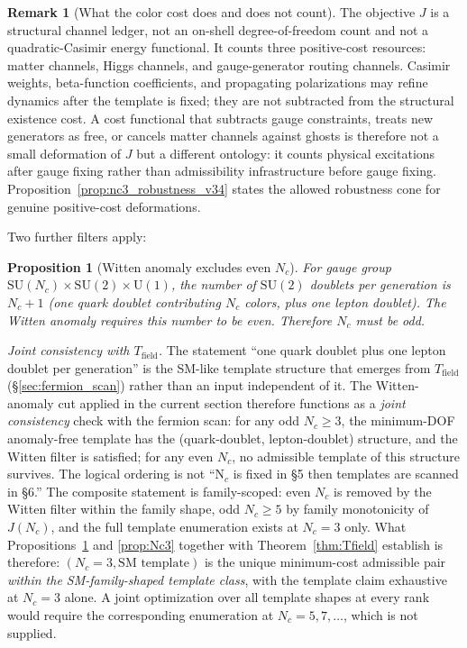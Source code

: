 \documentclass[11pt]{article}
\newtheorem{proposition}[theorem]{Proposition}
\theoremstyle{definition}
\newtheorem{remark}[theorem]{Remark}
\newcommand{\SU}{\mathrm{SU}}
\newcommand{\U}{\mathrm{U}}
\begin{document}
\begin{remark}[What the color cost does and does not count]
\label{rem:color_cost_functional_v35}
The objective $J$ is a structural channel ledger, not an on-shell degree-of-freedom count and not a quadratic-Casimir energy functional.  It counts three positive-cost resources: matter channels, Higgs channels, and gauge-generator routing channels.  Casimir weights, beta-function coefficients, and propagating polarizations may refine dynamics after the template is fixed; they are not subtracted from the structural existence cost.  A cost functional that subtracts gauge constraints, treats new generators as free, or cancels matter channels against ghosts is therefore not a small deformation of $J$ but a different ontology: it counts physical excitations after gauge fixing rather than admissibility infrastructure before gauge fixing.  Proposition~\ref{prop:nc3_robustness_v34} states the allowed robustness cone for genuine positive-cost deformations.
\end{remark}

Two further filters apply:

\begin{proposition}[Witten anomaly excludes even $N_c$]\label{prop:witten}
For gauge group $\SU(N_c) \times \SU(2) \times \U(1)$, the number of
$\SU(2)$ doublets per generation is $N_c + 1$ (one quark doublet
contributing $N_c$ colors, plus one lepton doublet).  The Witten anomaly
\cite{Witten1982} requires this number to be even.  Therefore $N_c$ must
be odd.
\end{proposition}

\noindent\textit{Joint consistency with $T_{\mathrm{field}}$.}\quad
The statement ``one quark doublet plus one lepton doublet per generation''
is the SM-like template structure that emerges from $T_{\mathrm{field}}$
(\S\ref{sec:fermion_scan}) rather than an input independent of it.  The
Witten-anomaly cut applied in the current section therefore functions as
a \emph{joint consistency} check with the fermion scan: for any odd
$N_c \ge 3$, the minimum-DOF anomaly-free template has the (quark-doublet,
lepton-doublet) structure, and the Witten filter is satisfied; for any
even $N_c$, no admissible template of this structure survives.  The
logical ordering is not ``N$_c$ is fixed in \S5 then templates are scanned
in \S6.''  The composite statement is family-scoped: even $N_c$ is
removed by the Witten filter within the family shape, odd $N_c \ge 5$
by family monotonicity of $J(N_c)$, and the full template enumeration
exists at $N_c = 3$ only.  What Propositions~\ref{prop:witten}
and \ref{prop:Nc3} together with Theorem~\ref{thm:Tfield} establish is
therefore: $(N_c = 3, \text{SM template})$ is the unique minimum-cost
admissible pair \emph{within the SM-family-shaped template class}, with
the template claim exhaustive at $N_c = 3$ alone.  A joint optimization
over all template shapes at every rank would require the corresponding
enumeration at $N_c = 5, 7, \ldots$, which is not supplied.
\end{document}

